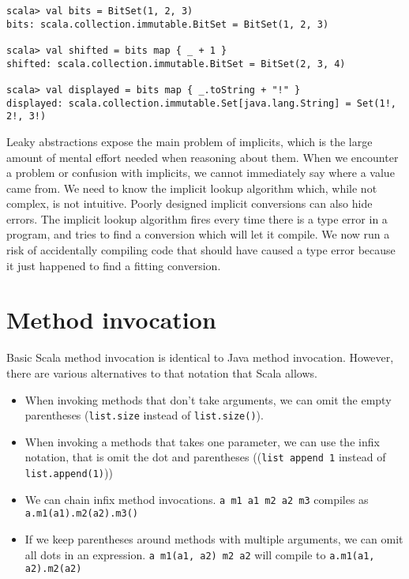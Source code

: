 \begin{lstlisting}[caption=Bitset example, label=code:bitset]
scala> val bits = BitSet(1, 2, 3)
bits: scala.collection.immutable.BitSet = BitSet(1, 2, 3)

scala> val shifted = bits map { _ + 1 }
shifted: scala.collection.immutable.BitSet = BitSet(2, 3, 4)

scala> val displayed = bits map { _.toString + "!" }
displayed: scala.collection.immutable.Set[java.lang.String] = Set(1!, 2!, 3!)
\end{lstlisting}

Leaky abstractions expose the main problem of implicits, which is the large amount of mental effort needed when reasoning about them. When we encounter a problem or confusion with implicits, we cannot immediately say where a value came from. We need to know the implicit lookup algorithm which, while not complex, is not intuitive. Poorly designed implicit conversions can also hide errors. The implicit lookup algorithm fires every time there is a type error in a program, and tries to find a conversion which will let it compile. We now run a risk of accidentally compiling code that should have caused a type error because it just happened to find a fitting conversion.

\section{Method invocation}

Basic Scala method invocation is identical to Java method invocation. However, there are various alternatives to that notation that Scala allows.

\begin{itemize}
	\item When invoking methods that don't take arguments, we can omit the empty parentheses (\texttt{list.size} instead of \texttt{list.size()}).
	\item When invoking a methods that takes one parameter, we can use the infix notation, that is omit the dot and parentheses ((\texttt{list append 1} instead of \texttt{list.append(1)}))
	\item We can chain infix method invocations. \texttt{a m1 a1 m2 a2 m3} compiles as \texttt{a.m1(a1).m2(a2).m3()}
	\item If we keep parentheses around methods with multiple arguments, we can omit all dots in an expression. \texttt{a m1(a1, a2) m2 a2} will compile to \texttt{a.m1(a1, a2).m2(a2)}
\end{itemize}

